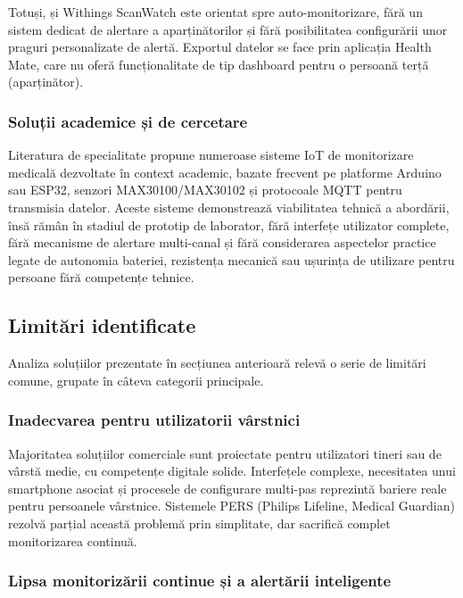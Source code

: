 ﻿\documentclass[12pt,a4paper,twoside]{article}
\begin{document}
Totuși, și Withings ScanWatch este orientat spre auto-monitorizare, fără un sistem dedicat de alertare a aparținătorilor și fără posibilitatea configurării unor praguri personalizate de alertă. Exportul datelor se face prin aplicația Health Mate, care nu oferă funcționalitate de tip dashboard pentru o persoană terță (aparținător).

\subsubsection{Soluții academice și de cercetare}

Literatura de specialitate propune numeroase sisteme IoT de monitorizare medicală dezvoltate în context academic, bazate frecvent pe platforme Arduino sau ESP32, senzori MAX30100/MAX30102 și protocoale MQTT pentru transmisia datelor. Aceste sisteme demonstrează viabilitatea tehnică a abordării, însă rămân în stadiul de prototip de laborator, fără interfețe utilizator complete, fără mecanisme de alertare multi-canal și fără considerarea aspectelor practice legate de autonomia bateriei, rezistența mecanică sau ușurința de utilizare pentru persoane fără competențe tehnice.

\subsection{Limitări identificate}

Analiza soluțiilor prezentate în secțiunea anterioară relevă o serie de limitări comune, grupate în câteva categorii principale.

\subsubsection{Inadecvarea pentru utilizatorii vârstnici}

Majoritatea soluțiilor comerciale sunt proiectate pentru utilizatori tineri sau de vârstă medie, cu competențe digitale solide. Interfețele complexe, necesitatea unui smartphone asociat și procesele de configurare multi-pas reprezintă bariere reale pentru persoanele vârstnice. Sistemele PERS (Philips Lifeline, Medical Guardian) rezolvă parțial această problemă prin simplitate, dar sacrifică complet monitorizarea continuă.

\subsubsection{Lipsa monitorizării continue și a alertării inteligente}
\end{document}
